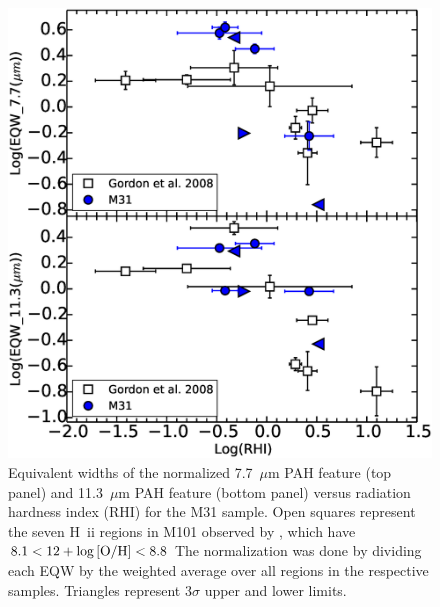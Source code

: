 \begin{figure}
\centering
\includegraphics[scale=0.30]{./fig11.eps}
\caption{Equivalent widths of the normalized 7.7~$\mu$m PAH feature (top panel) and 11.3~$\mu$m PAH feature (bottom panel) versus 
radiation hardness index (RHI) for the M31 sample. Open squares represent the seven H~{\sc ii} regions in M101 observed  by \citet{Gordon:2008lr},  
which have $8.1<12+\log{\rm[O/H]}<8.8$ 
The normalization was done by dividing each EQW by the weighted average over all regions in the respective samples. 
Triangles represent $3\sigma$ upper and lower limits.} 
\label{gordII}
\end{figure}

